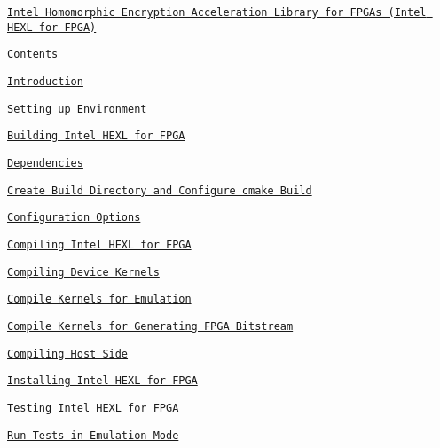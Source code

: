 \begin{DoxyItemize}
\item \href{#intel-homomorphic-encryption-acceleration-library-for-fpgas-intel-hexl-for-fpga}{\tt Intel Homomorphic Encryption Acceleration Library for F\-P\-G\-As (Intel H\-E\-X\-L for F\-P\-G\-A)}
\begin{DoxyItemize}
\item \href{#contents}{\tt Contents}
\item \href{#introduction}{\tt Introduction}
\item \href{#setting-up-environment}{\tt Setting up Environment}
\item \href{#building-intel-hexl-for-fpga}{\tt Building Intel H\-E\-X\-L for F\-P\-G\-A}
\begin{DoxyItemize}
\item \href{#dependencies}{\tt Dependencies}
\item \href{#create-build-directory-and-configure-cmake-build}{\tt Create Build Directory and Configure cmake Build}
\begin{DoxyItemize}
\item \href{#configuration-options}{\tt Configuration Options}
\end{DoxyItemize}
\item \href{#compiling-intel-hexl-for-fpga}{\tt Compiling Intel H\-E\-X\-L for F\-P\-G\-A}
\begin{DoxyItemize}
\item \href{#compiling-device-kernels}{\tt Compiling Device Kernels}
\begin{DoxyItemize}
\item \href{#compile-kernels-for-emulation}{\tt Compile Kernels for Emulation}
\item \href{#compile-kernels-for-generating-fpga-bitstream}{\tt Compile Kernels for Generating F\-P\-G\-A Bitstream}
\end{DoxyItemize}
\item \href{#compiling-host-side}{\tt Compiling Host Side}
\end{DoxyItemize}
\end{DoxyItemize}
\item \href{#installing-intel-hexl-for-fpga}{\tt Installing Intel H\-E\-X\-L for F\-P\-G\-A}
\item \href{#testing-intel-hexl-for-fpga}{\tt Testing Intel H\-E\-X\-L for F\-P\-G\-A}
\begin{DoxyItemize}
\item \href{#run-tests-in-emulation-mode}{\tt Run Tests in Emulation Mode}

\end{DoxyItemize}
\end{DoxyItemize}
\end{DoxyItemize}
